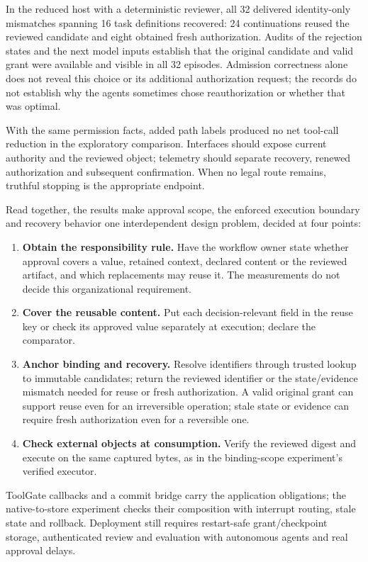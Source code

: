 \documentclass[pdflatex,sn-basic]{sn-jnl}
\providecommand{\tightlist}{\setlength{\itemsep}{0pt}\setlength{\parskip}{0pt}}
\begin{document}
In the reduced host with a deterministic reviewer, all 32 delivered identity-only mismatches spanning 16 task definitions recovered: 24 continuations reused the reviewed candidate and eight obtained fresh authorization. Audits of the rejection states and the next model inputs establish that the original candidate and valid grant were available and visible in all 32 episodes. Admission correctness alone does not reveal this choice or its additional authorization request; the records do not establish why the agents sometimes chose reauthorization or whether that was optimal.

With the same permission facts, added path labels produced no net tool-call reduction in the exploratory comparison. Interfaces should expose current authority and the reviewed object; telemetry should separate recovery, renewed authorization and subsequent confirmation. When no legal route remains, truthful stopping is the appropriate endpoint.

Read together, the results make approval scope, the enforced execution boundary and recovery behavior one interdependent design problem, decided at four points:
\begin{enumerate}
\tightlist
\item \textbf{Obtain the responsibility rule.} Have the workflow owner state whether approval covers a value, retained context, declared content or the reviewed artifact, and which replacements may reuse it. The measurements do not decide this organizational requirement.
\item \textbf{Cover the reusable content.} Put each decision-relevant field in the reuse key or check its approved value separately at execution; declare the comparator.
\item \textbf{Anchor binding and recovery.} Resolve identifiers through trusted lookup to immutable candidates; return the reviewed identifier or the state/evidence mismatch needed for reuse or fresh authorization. A valid original grant can support reuse even for an irreversible operation; stale state or evidence can require fresh authorization even for a reversible one.
\item \textbf{Check external objects at consumption.} Verify the reviewed digest and execute on the same captured bytes, as in the binding-scope experiment's verified executor.
\end{enumerate}

ToolGate callbacks and a commit bridge carry the application obligations; the native-to-store experiment checks their composition with interrupt routing, stale state and rollback. Deployment still requires restart-safe grant/checkpoint storage, authenticated review and evaluation with autonomous agents and real approval delays.
\end{document}
